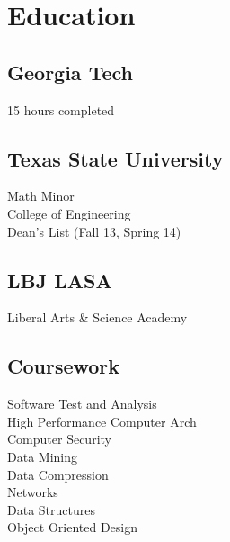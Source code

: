 \documentclass[letterpaper]{resume} %
\begin{document}
\begin{minipage}[t]{0.33\textwidth} %


\section{Education} 

\subsection{Georgia Tech}
15 hours completed\\ 

\sectionspace

\subsection{Texas State University}
Math Minor \\
College of Engineering \\
Dean's List (Fall 13, Spring 14) \\

\sectionspace %


\subsection{LBJ LASA}
Liberal Arts \& Science Academy \\

\sectionspace %


\subsection{Coursework}

Software Test and Analysis \\
High Performance Computer Arch \\
Computer Security \\
Data Mining \\
Data Compression \\
Networks \\
Data Structures \\
Object Oriented Design


\end{minipage}
\end{document}
